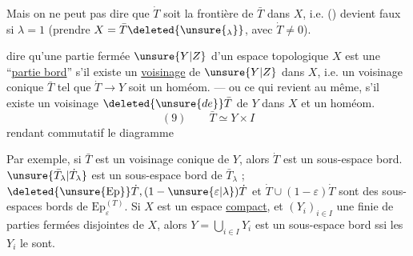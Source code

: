 Mais on ne peut pas dire  que $\dot T$ soit la frontière
de $\bar T$ dans $X$, i.e. () devient faux si $\lambda=1$
(prendre $X=\bar T\deleted{\unsure{_\lambda}}$, avec $\dot T\neq0$).

  dire qu'une partie fermée $\unsure{Y|Z}$ d'un
espace topologique $X$ est une ``\uline{partie bord}''
s'il existe un \uline{voisinage} 
 de $\unsure{Y|Z}$ dans $X$,
i.e. un voisinage  conique $\bar T$ tel que
$\dot T\longrightarrow Y$ soit un homéom. --- ou ce qui revient
au même,  s'il existe un
voisinage $\deleted{\unsure{de}}\bar T$ de $Y$ dans $X$ et un homéom.
\[
(9)\qquad\bar T\simeq Y\times I
\]
rendant commutatif le diagramme

Par exemple, si $\bar T$ est un voisinage  conique
 de  $Y$, alors $\dot T$ est un sous-espace bord.
 $\unsure{\bar T_\lambda|\dot T_\lambda}$ est un sous-espace bord de $\bar T_\lambda$ ;
$\deleted{\unsure{\mathrm{Ep}}}\dot T,(1-\unsure{\varepsilon|\lambda})\dot T$
et $\dot T\cup(1-\varepsilon)\dot T$ sont des sous-espaces
bords de $\mathrm{Ep}_\varepsilon^{(T)}$. 
Si $X$ est un espace
\uline{compact}, et $(Y_i)_{i\in I}$ une  finie de
parties fermées disjointes de $X$, alors
$Y=\bigcup_{i\in I}Y_i$ est un sous-espace bord ssi les $Y_i$ le sont.
